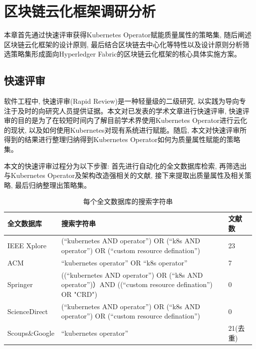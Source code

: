 \chapter{区块链云化框架调研分析}

本章首先通过快速评审获得Kubernetes Operator赋能质量属性的策略集,  随后阐述区块链云化框架的设计原则, 最后结合区块链去中心化等特性以及设计原则分析筛选策略集形成面向Hyperledger Fabric的区块链云化框架的核心具体实施方案。

\section{快速评审}\label{section: rapid_reviews}

软件工程中, 快速评审(Rapid Review)是一种轻量级的二级研究, 以实践为导向专注于及时的向研究人员提供证据\cite{cartaxo2020rapid}。本文对已发表的学术文章进行快速评审, 快速评审的目的是为了在较短时间内了解目前学术界使用Kubernetes Operator进行云化的现状, 以及如何使用Kubernetes对现有系统进行赋能。随后, 本文对快速评审所得到的结果进行整理归纳得到Kubernetes Operator如何为质量属性赋能的策略集。

本文的快速评审过程分为以下步骤: 首先进行自动化的全文数据库检索, 再筛选出与Kubernetes Operator及架构改造强相关的文献, 接下来提取出质量属性及相关策略, 最后归纳整理出策略集。

{\footnotesize
\begin{longtable}[h]{m{60pt} m{210pt} m{40pt}<{\centering}}
    \caption[每个全文数据库的搜索字符串]{每个全文数据库的搜索字符串} \label{search_string} \\
        \toprule  
        \textbf{全文数据库}&\textbf{搜索字符串}&\textbf{文献数}\\
        \hline
        IEEE Xplore &(“kubernetes AND operator”) OR (“k8s AND operator”) OR (“custom resource defination”) & 23 \\

        ACM & “kubernetes operator” OR “k8s operator” & 7 \\

        Springer &((“kubernetes AND operator”) OR (“k8s AND operator”)）AND ((“custom resource defination”) OR "CRD") & 0 \\

        ScienceDirect &(“kubernetes AND operator”) OR (“k8s AND operator”) OR (“custom resource defination”) & 0 \\
        \hline
        Scoups\&Google &“kubernetes operator”& 21(去重) \\
        \bottomrule
    \end{longtable}
}

